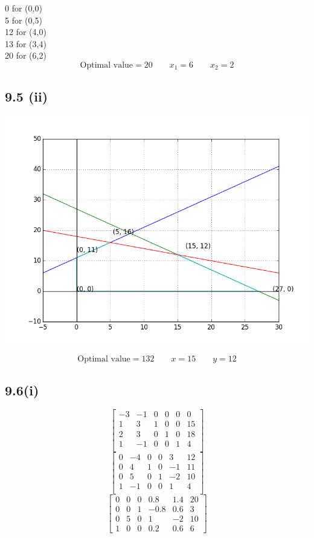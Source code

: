 \documentclass[letterpaper,12pt]{article}
\theoremstyle{definition}
\begin{document}
0 for (0,0)\\
5 for (0,5)\\
12 for (4,0)\\
13 for (3,4)\\
20 for (6,2)\\

\[ \text{Optimal value} = 20 \qquad x_1 = 6 \qquad x_2 = 2\]

\subsection*{9.5 (ii)}

\includegraphics[scale = .75]{second95}

\[ \text{Optimal value} = 132 \qquad x = 15 \qquad y = 12\]

\subsection*{9.6(i)}

\[
\begin{bmatrix}
 -3 & -1 & 0 & 0 & 0 &  0 \\
  1 &  3 & 1 & 0 & 0 & 15 \\
  2 &  3 & 0 & 1 & 0 & 18 \\
  1 & -1 & 0 & 0 & 1 &  4 \\
\end{bmatrix}
\]
\[
\begin{bmatrix}
 0 & -4 & 0 & 0 &  3 & 12 \\
 0 &  4 & 1 & 0 & -1 & 11 \\
 0 &  5 & 0 & 1 & -2 & 10 \\
 1 & -1 & 0 & 0 &  1 &  4 \\
\end{bmatrix}
\]
\[
\begin{bmatrix}
 0 & 0 & 0 &  0.8 &  1.4 & 20 \\
 0 & 0 & 1 & -0.8 &  0.6 &  3 \\
 0 & 5 & 0 &  1   & -2   & 10 \\
 1 & 0 & 0 &  0.2 &  0.6 &  6
\end{bmatrix}
\]
\end{document}
